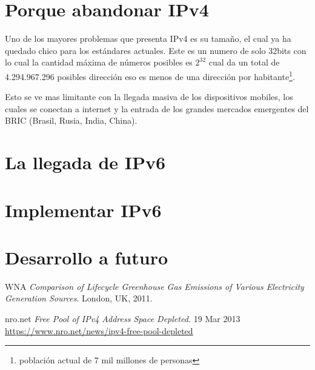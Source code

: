 \documentclass[11pt,a4paper]{article}
\author{Ignacio Perez Laborda}
\begin{document}


\tableofcontents

\listoffigures

\newpage

\section{Porque abandonar IPv4}
Uno de los mayores problemas que presenta IPv4 es su tamaño, el cual ya ha quedado chico para los
estándares actuales. Este es un numero de solo 32bits con lo cual la cantidad máxima de números
posibles es $2^{32}$ cual da un total de 4.294.967.296 posibles dirección eso es menos de una
dirección por habitante\footnote{población actual de 7 mil millones de personas}.\par
Esto se ve mas limitante con la llegada masiva de los dispositivos mobiles, los cuales se conectan
a internet y la entrada de los grandes mercados emergentes del BRIC (Brasil, Rusia, India, China).

\section{La llegada de IPv6}
\section{Implementar IPv6}
\section{Desarrollo a futuro}

\newpage
\begin{thebibliography}{9}
  WNA
  \emph{Comparison of Lifecycle Greenhouse Gas Emissions of Various Electricity Generation Sources}.
  London, UK,
  2011.
		
		
 nro.net
 \emph{Free Pool of IPv4 Address Space Depleted.} 
 19 Mar 2013\\
	\url{https://www.nro.net/news/ipv4-free-pool-depleted}		
		
\end{thebibliography}
\end{document}
